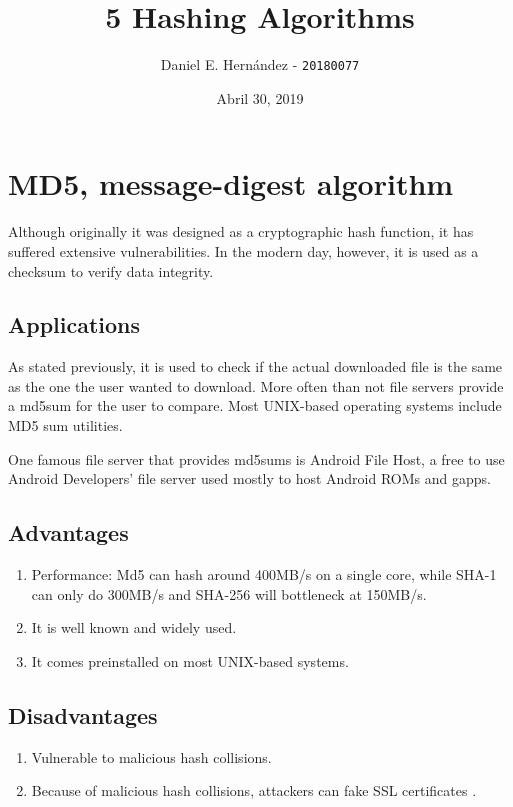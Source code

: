 \documentclass[]{article}
\title{\textbf{5 Hashing Algorithms}}
\author{Daniel E. Hernández - \texttt{20180077}}
\affil{Facultad de Ciencias Económicas, Universidad Francisco Marroquín, Guatemala}
\date{Abril 30, 2019}
\begin{document}
\maketitle

\begin{abstract}

\end{abstract}

\section{MD5, message-digest algorithm}
Although originally it was designed as a cryptographic hash function, it has suffered extensive vulnerabilities. In the modern day, however, it is used as a checksum to verify data integrity.

	\subsection{Applications}
		As stated previously, it is used to check if the actual downloaded file is the same as the one the user wanted to download. More often than not file servers provide a md5sum for the user to compare. Most UNIX-based operating systems include MD5 sum utilities.
		
		\par One famous file server that provides md5sums is Android File Host, a free to use Android Developers' file server used mostly to host Android ROMs and gapps.
	
	\subsection{Advantages}
	\begin{enumerate}
		\item Performance: Md5 can hash around 400MB/s on a single core, while SHA-1 can only do 300MB/s and SHA-256 will bottleneck at 150MB/s\cite{HashMD5Considered}.
		\item It is well known and widely used.
		\item It comes preinstalled on most UNIX-based systems. 
	\end{enumerate}


	
	\subsection{Disadvantages}
	\begin{enumerate}
		\item Vulnerable to malicious hash collisions.
		\item Because of malicious hash collisions, attackers can fake SSL certificates \cite{MD5WeaknessAllows}. 
	\end{enumerate}
\end{document}
